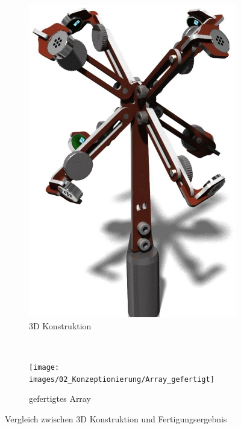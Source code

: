 \begin{figure}
        \centering
        \begin{subfigure}[b]{0.4\textwidth}
                \centering
                \includegraphics[width=\textwidth]{images/02_Konzeptionierung/3D_Konstruktion_Array_ohne_Kanten}
                \caption{3D Konstruktion}
                \label{fig:3D_Konstruktion_Array_ohne_Kanten}
        \end{subfigure}
        ~ %
        \begin{subfigure}[b]{0.47\textwidth}
                \centering
                \texttt{[image: images/02\_Konzeptionierung/Array\_gefertigt]}
                \caption{gefertigtes Array}
                \label{fig:Array_gefertigt}
        \end{subfigure}
        \caption{Vergleich zwischen 3D Konstruktion und Fertigungsergebnis}
        \label{fig:Vergleich_array_gefertigt}
\end{figure}









